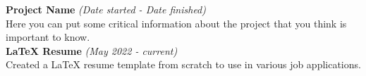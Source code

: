 \documentclass[class=article, crop=false]{standalone}
\begin{document}
\textbf{Project Name} \textsl{(Date started - Date finished)} \\
Here you can put some critical information about the project that you think is 
important to know. \\

\textbf{LaTeX Resume} \textsl{(May 2022 - current)} \\ 
Created a LaTeX resume template from scratch to use in various job applications. \\
\end{document}
